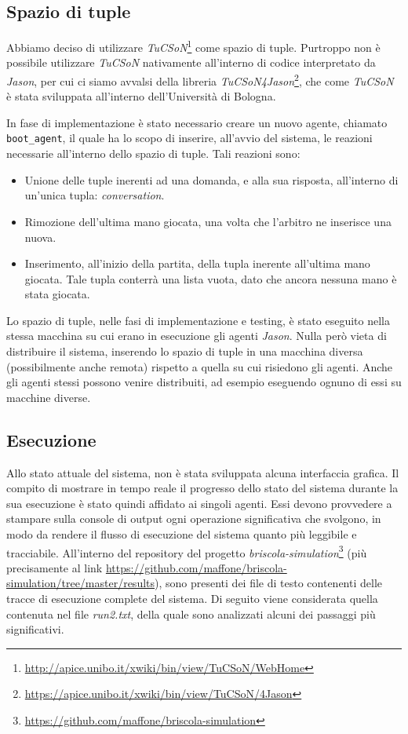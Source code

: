 \documentclass[a4paper,12pt]{article}
\begin{document}
\subsection{Spazio di tuple}
Abbiamo deciso di utilizzare \emph{TuCSoN}\footnote{\url{http://apice.unibo.it/xwiki/bin/view/TuCSoN/WebHome}} come spazio di tuple. Purtroppo non è possibile utilizzare \emph{TuCSoN} nativamente all'interno di codice interpretato da \emph{Jason}, per cui ci siamo avvalsi della libreria \emph{TuCSoN4Jason}\footnote{\url{https://apice.unibo.it/xwiki/bin/view/TuCSoN/4Jason}}, che come \emph{TuCSoN} è stata sviluppata all'interno dell'Università di Bologna. 

In fase di implementazione è stato necessario creare un nuovo agente, chiamato \texttt{boot\_agent}, il quale ha lo scopo di inserire, all'avvio del sistema, le reazioni necessarie all'interno dello spazio di tuple. Tali reazioni sono: 
\begin{itemize}
	\item Unione delle tuple inerenti ad una domanda, e alla sua risposta, all'interno di un'unica tupla: \emph{conversation}.
	\item Rimozione dell'ultima mano giocata, una volta che l'arbitro ne inserisce una nuova.
	\item Inserimento, all'inizio della partita, della tupla inerente all'ultima mano giocata. Tale tupla conterrà una lista vuota, dato che ancora nessuna mano è stata giocata.
\end{itemize}
Lo spazio di tuple, nelle fasi di implementazione e testing, è stato eseguito nella stessa macchina su cui erano in esecuzione gli agenti \emph{Jason}. Nulla però vieta di distribuire il sistema, inserendo lo spazio di tuple in una macchina diversa (possibilmente anche remota) rispetto a quella su cui risiedono gli agenti. Anche gli agenti stessi possono venire distribuiti, ad esempio eseguendo ognuno di essi su macchine diverse.

\subsection{Esecuzione}
Allo stato attuale del sistema, non è stata sviluppata alcuna interfaccia grafica. Il compito di mostrare in tempo reale il progresso dello stato del sistema durante la sua esecuzione è stato quindi affidato ai singoli agenti. Essi devono provvedere a stampare sulla console di output ogni operazione significativa che svolgono, in modo da rendere il flusso di esecuzione del sistema quanto più leggibile e tracciabile. All'interno del repository del progetto \emph{briscola-simulation}\footnote{\url{https://github.com/maffone/briscola-simulation}} (più precisamente al link \url{https://github.com/maffone/briscola-simulation/tree/master/results}), sono presenti dei file di testo contenenti delle tracce di esecuzione complete del sistema. Di seguito viene considerata quella contenuta nel file \emph{run2.txt}, della quale sono analizzati alcuni dei passaggi più significativi.
\end{document}
